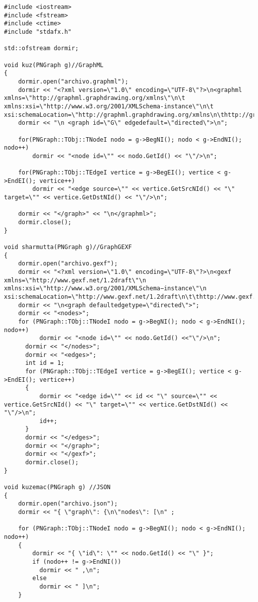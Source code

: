\documentclass[12pt]{article}
\begin{document}
\begin{lstlisting}
#include <iostream>
#include <fstream>
#include <ctime>
#include "stdafx.h"

std::ofstream dormir;

void kuz(PNGraph g)//GraphML
{
    dormir.open("archivo.graphml");
    dormir << "<?xml version=\"1.0\" encoding=\"UTF-8\"?>\n<graphml xmlns=\"http://graphml.graphdrawing.org/xmlns\"\n\t xmlns:xsi=\"http://www.w3.org/2001/XMLSchema-instance\"\n\t xsi:schemaLocation=\"http://graphml.graphdrawing.org/xmlns\n\thttp://graphml.graphdrawing.org/xmlns/1.0/graphml.xsd\">\n";
    dormir << "\n <graph id=\"G\" edgedefault=\"directed\">\n";

    for(PNGraph::TObj::TNodeI nodo = g->BegNI(); nodo < g->EndNI(); nodo++)
        dormir << "<node id=\"" << nodo.GetId() << "\"/>\n";

    for(PNGraph::TObj::TEdgeI vertice = g->BegEI(); vertice < g->EndEI(); vertice++)
        dormir << "<edge source=\"" << vertice.GetSrcNId() << "\" target=\"" << vertice.GetDstNId() << "\"/>\n";

    dormir << "</graph>" << "\n</graphml>";
    dormir.close();
}

void sharmutta(PNGraph g)//GraphGEXF
{
    dormir.open("archivo.gexf");
    dormir << "<?xml version=\"1.0\" encoding=\"UTF-8\"?>\n<gexf xmlns=\"http://www.gexf.net/1.2draft\"\n xmlns:xsi=\"http://www.w3.org/2001/XMLSchema−instance\"\n xsi:schemaLocation=\"http://www.gexf.net/1.2draft\n\t\thttp://www.gexf.net/1.2draft/gexf.xsd\"\nversion=\"1.2\">";
    dormir << "\n<graph defaultedgetype=\"directed\">";
    dormir << "<nodes>";
    for (PNGraph::TObj::TNodeI nodo = g->BegNI(); nodo < g->EndNI(); nodo++)
          dormir << "<node id=\"" << nodo.GetId() <<"\"/>\n";
      dormir << "</nodes>";
      dormir << "<edges>";
      int id = 1;
      for (PNGraph::TObj::TEdgeI vertice = g->BegEI(); vertice < g->EndEI(); vertice++)
      {
          dormir << "<edge id=\"" << id << "\" source=\"" << vertice.GetSrcNId() << "\" target=\"" << vertice.GetDstNId() << "\"/>\n";
          id++;
      }
      dormir << "</edges>";
      dormir << "</graph>";
      dormir << "</gexf>";
      dormir.close();
}

void kuzemac(PNGraph g) //JSON
{
    dormir.open("archivo.json");
    dormir << "{ \"graph\": {\n\"nodes\": [\n" ;

    for (PNGraph::TObj::TNodeI nodo = g->BegNI(); nodo < g->EndNI(); nodo++)
    {
        dormir << "{ \"id\": \"" << nodo.GetId() << "\" }";
        if (nodo++ != g->EndNI())
          dormir << " ,\n";
        else
          dormir << " ]\n";
    }


\end{lstlisting}
\end{document}
